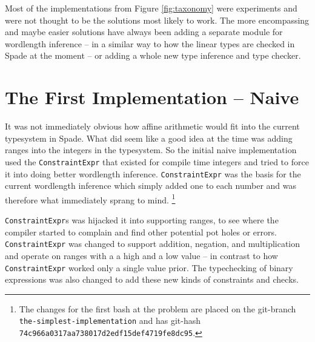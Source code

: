 Most of the implementations from Figure \ref{fig:taxonomy} were experiments and were not thought to be the solutions most likely to work. The more encompassing and maybe easier solutions have always been adding a separate module for wordlength inference -- in a similar way to how the linear types are checked in Spade at the moment -- or adding a whole new type inference and type checker.


\section{The First Implementation -- Naive}
\label{sec:First}

It was not immediately obvious how affine arithmetic would fit into the current typesystem in Spade. What did seem like a good idea at the time was adding ranges into the integers in the typesystem. So the initial naive implementation used the \verb+ConstraintExpr+ that existed for compile time integers and tried to force it into doing better wordlength inference. \verb+ConstraintExpr+ was the basis for the current wordlength inference which simply added one to each number and was therefore what immediately sprang to mind. 
\cprotect\footnote{The changes for the first bash at the problem are placed on the git-branch \verb+the-simplest-implementation+ and has git-hash \verb+74c966a0317aa738017d2edf15def4719fe8dc95+.}


\verb+ConstraintExpr+s was hijacked it into supporting ranges, to see where the compiler started to complain and find other potential pot holes or errors. \verb+ConstraintExpr+ was changed to support addition, negation, and multiplication and operate on ranges with a a high and a low value -- in contrast to how \verb+ConstraintExpr+ worked only a single value prior. The typechecking of binary expressions was also changed to add these new kinds of constraints and checks.

